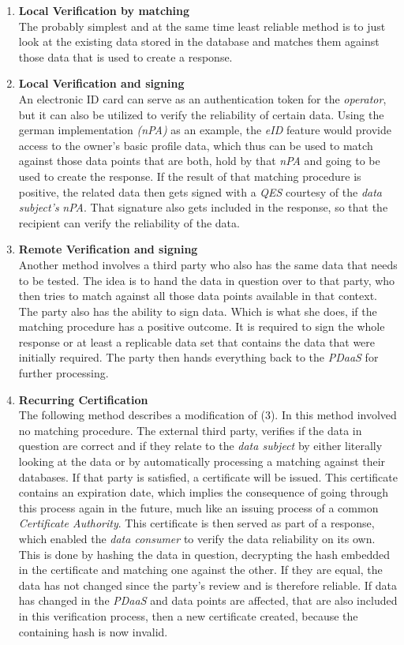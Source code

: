 \documentclass[12pt,english,a4paper,titlepage,cleardoublepage=empty,dottedtoc]{report}
\begin{document}
\begin{enumerate}
\def\labelenumi{(\arabic{enumi})}
\item
  \textbf{Local Verification by matching}\\
  The probably simplest and at the same time least reliable method is to
  just look at the existing data stored in the database and matches them
  against those data that is used to create a response.
\item
  \textbf{Local Verification and signing}\\
  An electronic ID card can serve as an authentication token for the
  \emph{operator}, but it can also be utilized to verify the reliability
  of certain data. Using the german implementation \emph{(nPA)} as an
  example, the \emph{eID} feature would provide access to the owner's
  basic profile data, which thus can be used to match against those data
  points that are both, hold by that \emph{nPA} and going to be used to
  create the response. If the result of that matching procedure is
  positive, the related data then gets signed with a \emph{QES} courtesy
  of the \emph{data subject's} \emph{nPA}. That signature also gets
  included in the response, so that the recipient can verify the
  reliability of the data.
\item
  \textbf{Remote Verification and signing}\\
  Another method involves a third party who also has the same data that
  needs to be tested. The idea is to hand the data in question over to
  that party, who then tries to match against all those data points
  available in that context. The party also has the ability to sign
  data. Which is what she does, if the matching procedure has a positive
  outcome. It is required to sign the whole response or at least a
  replicable data set that contains the data that were initially
  required. The party then hands everything back to the \emph{PDaaS} for
  further processing.
\item
  \textbf{Recurring Certification}\\
  The following method describes a modification of (3). In this method
  involved no matching procedure. The external third party, verifies if
  the data in question are correct and if they relate to the \emph{data
  subject} by either literally looking at the data or by automatically
  processing a matching against their databases. If that party is
  satisfied, a certificate will be issued. This certificate contains an
  expiration date, which implies the consequence of going through this
  process again in the future, much like an issuing process of a common
  \emph{Certificate Authority}. This certificate is then served as part
  of a response, which enabled the \emph{data consumer} to verify the
  data reliability on its own. This is done by hashing the data in
  question, decrypting the hash embedded in the certificate and matching
  one against the other. If they are equal, the data has not changed
  since the party's review and is therefore reliable. If data has
  changed in the \emph{PDaaS} and data points are affected, that are
  also included in this verification process, then a new certificate
  created, because the containing hash is now invalid.
\end{enumerate}
\end{document}
